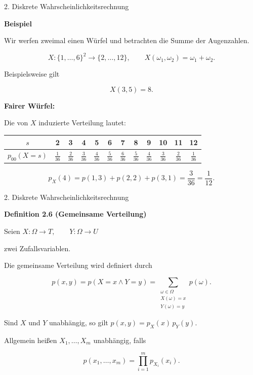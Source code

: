\documentclass{beamer}
\begin{document}
\begin{frame}{2. Diskrete Wahrscheinlichkeitsrechnung}

\textbf{Beispiel}

\vspace{0.2cm}

Wir werfen zweimal einen Würfel und betrachten die Summe
der Augenzahlen.

\[
X:\{1,\ldots,6\}^2\rightarrow\{2,\ldots,12\},
\qquad
X(\omega_1,\omega_2)=\omega_1+\omega_2.
\]

Beispielsweise gilt

\[
X(3,5)=8.
\]

\vspace{0.3cm}

\textbf{Fairer Würfel:}

Die von \(X\) induzierte Verteilung lautet:

\begin{center}
\small
\begin{tabular}{c|ccccccccccc}
$s$ & 2 & 3 & 4 & 5 & 6 & 7 & 8 & 9 & 10 & 11 & 12\\
\hline
$p_{00}(X=s)$
&
$\frac1{36}$
&
$\frac2{36}$
&
$\frac3{36}$
&
$\frac4{36}$
&
$\frac5{36}$
&
$\frac6{36}$
&
$\frac5{36}$
&
$\frac4{36}$
&
$\frac3{36}$
&
$\frac2{36}$
&
$\frac1{36}$
\end{tabular}
\end{center}

\vspace{0.2cm}

\[
p_X(4)
=
p(1,3)+p(2,2)+p(3,1)
=
\frac{3}{36}
=
\frac{1}{12}.
\]

\end{frame}

\begin{frame}{2. Diskrete Wahrscheinlichkeitsrechnung}

\textbf{Definition 2.6 (Gemeinsame Verteilung)}

\vspace{0.3cm}

Seien \(X:\Omega\to T,
\qquad
Y:\Omega\to U\)

zwei Zufallsvariablen.

\vspace{0.3cm}

Die gemeinsame Verteilung wird definiert durch

\[
p(x,y)
=
p(X=x \land Y=y)
=
\sum_{\substack{\omega\in\Omega\\
X(\omega)=x\\
Y(\omega)=y}}
p(\omega).
\]

\vspace{0.3cm}

Sind \(X\) und \(Y\) unabhängig, so gilt \(p(x,y)=p_X(x)\,p_Y(y).\)

\vspace{0.3cm}

Allgemein heißen \(X_1,\ldots,X_m\) unabhängig, falls

\[
p(x_1,\ldots,x_m)
=
\prod_{i=1}^{m} p_{X_i}(x_i).
\]

\end{frame}
\end{document}
